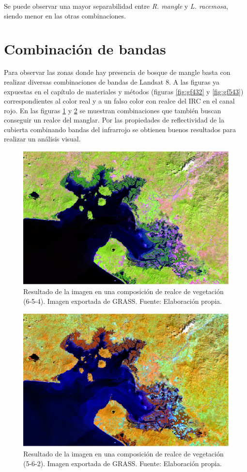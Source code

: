 Se puede observar una mayor separabilidad entre \textit{R. mangle} y \textit{L. racemosa}, siendo menor en las otras combinaciones.

\section{Combinación de bandas}
Para observar las zonas donde hay presencia de bosque de mangle basta con realizar diversas combinaciones de bandas de Landsat 8. A las figuras ya expuestas en el capítulo de materiales y métodos (figuras \ref{fig:gf432} y \ref{fig:gf543}) correspondientes al color real y a un falso color con realce del \ac{IRC} en el canal rojo. En las figuras \ref{fig:gf654} y \ref{fig:gf562} se muestran combinaciones que también buscan conseguir un realce del manglar. Por las propiedades de reflectividad de la cubierta combinando bandas del infrarrojo se obtienen buenos resultados para realizar un análisis visual.

\begin{figure}
	\centering
	\includegraphics[width=0.8\linewidth]{./Imagenes/GF654.eps}
	\caption[Composición 654]{Resultado de la imagen en una composición de realce de vegetación (6-5-4). Imagen exportada de GRASS. Fuente: Elaboración propia.}
	\label{fig:gf654}
\end{figure}

\begin{figure}
	\centering
	\includegraphics[width=0.8\linewidth]{./Imagenes/GF562.eps}
	\caption[Composición 562]{Resultado de la imagen en una composición de realce de vegetación (5-6-2). Imagen exportada de GRASS. Fuente: Elaboración propia.}
	\label{fig:gf562}
\end{figure}

